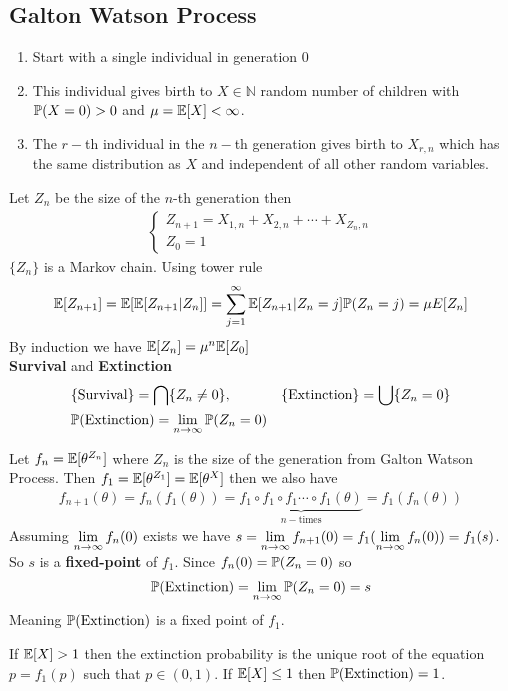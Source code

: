 \documentclass[12pt,a4paper]{article}
\begin{document}
\subsection{Galton Watson Process }
\begin{enumerate}[(1)]
\item Start with a single individual in generation 0
\item This individual gives birth to $X\in \mathbb{N}$ random number of children with $\P(X = 0) > 0$ and $\mu = \E[X] < \infty$. 
\item The $r-$th individual in the $n-$th generation gives birth to $X_{r,n}$ which has the same distribution as $X$ and independent of all other random variables.   
\end{enumerate}
Let $Z_n$ be the size of the $n$-th generation then 
\begin{align*}
\begin{cases}
Z_{n+1} = X_{1,n} + X_{2,n} + \cdots + X_{Z_n, n}\\
Z_{0} = 1
\end{cases}
\end{align*}
$\{Z_n\}$ is a Markov chain. Using tower rule 
\begin{align*}
\E[Z_{n+1}] = \E[\E[Z_{n+1} | Z_{n}]] = \nsum{j=1}{\infty}\E[Z_{n+1} | Z_n = j]\P(Z_n = j) = \mu E[Z_{n}]
\end{align*} 
By induction we have $\E[Z_n] = \mu^n \E[Z_0]$ \\
\textbf{Survival} and \textbf{Extinction}
\begin{align*}
&\{\text{Survival}\} = \bigcap \{Z_n \neq  0\}, & \{\text{Extinction}\} = \bigcup \{Z_n = 0\}\\ 
&\P(\text{Extinction}) = \nlim{n}{\infty}\P(Z_n = 0)
\end{align*}
\begin{example}
Let $f_n = \E[\theta^{Z_n}]$ where $Z_n$ is the size of the generation from Galton Watson Process. Then $f_1 = \E[\theta^{Z_1}] = \E[\theta^{X}]$ then we also have 
\begin{align*}
f_{n+1}(\theta) = f_n(f_1(\theta)) = \underbrace{f_1\circ f_1 \circ f_1 \cdots \circ f_1(\theta)}_{\text{$n-$times}} = f_1(f_n(\theta))
\end{align*}
Assuming $\nlim{n}{\infty}f_n(0)$ exists we have $s = \nlim{n}{\infty}f_{n+1}(0) = f_1(\nlim{n}{\infty}f_n(0)) = f_1(s)$. So $s$ is a \textbf{fixed-point} of $f_1$. Since $f_n(0) = \P(Z_n = 0)$ so 
\begin{align*}
\P(\text{Extinction}) = \nlim{n}{\infty}\P(Z_n = 0) = s
\end{align*}
Meaning $\P(\text{Extinction})$ is a fixed point of $f_1$. 
\end{example}
\begin{thm}
If $\E[X] > 1$ then the extinction probability is the unique root of the equation $p = f_1(p)$ such that $p\in (0,1)$. If $\E[X] \leq 1$ then $\P(\text{Extinction}) = 1$. 
\end{thm}
\newpage
\end{document}
